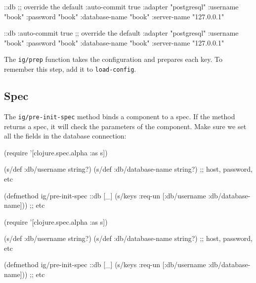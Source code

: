 \begin{english}
  \begin{clojure}
{::db {;; override the default
       :auto-commit   true
       :adapter       "postgresql"
       :username      "book"
       :password      "book"
       :database-name "book"
       :server-name   "127.0.0.1"}}
  \end{clojure}
\end{english}

\else

\begin{english}
  \begin{clojure}
{::db {:auto-commit   true ;; override the default
       :adapter       "postgresql"
       :username      "book"
       :password      "book"
       :database-name "book"
       :server-name   "127.0.0.1"}}
  \end{clojure}
\end{english}

\fi

The \verb|ig/prep| function takes the configuration and prepares each key. To remember this step, add it to \verb|load-config|.

\subsection{Spec}


The \verb|ig/pre-init-spec| method binds a component to a spec. If the method returns a spec, it will check the parameters of the component. Make sure we set all the fields in the database connection:

\ifnarrow

\begin{english}
  \begin{clojure}
(require '[clojure.spec.alpha :as s])

(s/def :db/username string?)
(s/def :db/database-name string?)
;; host, password, etc

(defmethod ig/pre-init-spec ::db [_]
  (s/keys :req-un [:db/username
                   :db/database-name]))
                   ;; etc
  \end{clojure}
\end{english}

\else

\begin{english}
  \begin{clojure}
(require '[clojure.spec.alpha :as s])

(s/def :db/username string?)
(s/def :db/database-name string?)
;; host, password, etc

(defmethod ig/pre-init-spec ::db [_]
  (s/keys :req-un [:db/username
                   :db/database-name])) ;; etc
  \end{clojure}
\end{english}

